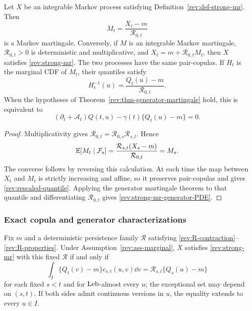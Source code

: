 \begin{proposition}
\label{rev:prop-martingale-rescaling}
Let $X$ be an integrable Markov process satisfying
Definition~\ref{rev:def-strong-mr}.  Then
\begin{equation}
M_t=\frac{X_t-m}{\mathcal R_{0,t}}
\label{rev:martingale-rescaling}
\end{equation}
is a Markov martingale.  Conversely, if $M$ is an integrable Markov martingale,
$\mathcal R_{0,t}>0$ is deterministic and multiplicative, and
$X_t=m+\mathcal R_{0,t}M_t$, then $X$ satisfies
\eqref{rev:strong-mr}.  The two processes have the same pair-copulas.  If
$H_t$ is the marginal CDF of $M_t$, their quantiles satisfy
\begin{equation}
H_t^{-1}(u)=\frac{Q_t(u)-m}{\mathcal R_{0,t}}.
\label{rev:rescaled-quantile}
\end{equation}
When the hypotheses of Theorem~\ref{rev:thm-generator-martingale} hold, this is
equivalent to
\begin{equation}
(\partial_t+\mathcal A_t)Q(t,u)
-\gamma(t)\{Q_t(u)-m\}=0.
\label{rev:strong-mr-generator-PDE}
\end{equation}
\end{proposition}

\begin{proof}
Multiplicativity gives
$\mathcal R_{0,t}=\mathcal R_{0,s}\mathcal R_{s,t}$.  Hence
\[
\mathbb E[M_t\mid\mathcal F_s]
=\frac{\mathcal R_{s,t}(X_s-m)}{\mathcal R_{0,t}}
=M_s.
\]
The converse follows by reversing this calculation.  At each time the map
between $X_t$ and $M_t$ is strictly increasing and affine, so it preserves
pair-copulas and gives \eqref{rev:rescaled-quantile}.  Applying the generator
martingale theorem to that quantile and differentiating
$\mathcal R_{0,t}$ gives \eqref{rev:strong-mr-generator-PDE}.
\end{proof}

\subsubsection{Exact copula and generator characterizations}

\begin{theorem}
\label{rev:thm-exact-mr}
Fix $m$ and a deterministic persistence family $\mathcal R$ satisfying
\eqref{rev:R-contraction}--\eqref{rev:R-properties}.  Under
Assumption~\ref{rev:ass-marginal}, $X$ satisfies
\eqref{rev:strong-mr} with this fixed $\mathcal R$ if and only if
\begin{equation}
\int_I\{Q_t(v)-m\}c_{s,t}(u,v)\dd v
=\mathcal R_{s,t}\{Q_s(u)-m\}
\label{rev:exact-mr-copula}
\end{equation}
for each fixed $s<t$ and for $\operatorname{Leb}$-almost every $u$; the exceptional set may
depend on $(s,t)$.  If both sides admit continuous versions in $u$, the equality
extends to every $u\in I$.
\end{theorem}


